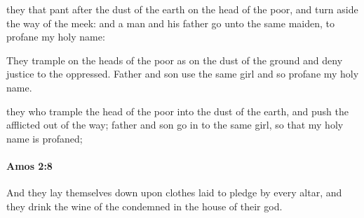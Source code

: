 			\begin{versebox}
					\item[BHS] 
					\item[LXX] 
					\item[ASV] they that pant after the dust of the earth on the head of the poor, and turn aside the way of the meek: and a man and his father go unto the same maiden, to profane my holy name:
					\item[NIV] They trample on the heads of the poor as on the dust of the ground and deny justice to the oppressed. Father and son use the same girl and so profane my holy name.
					\item[NRSV] they who trample the head of the poor into the dust of the earth, and push the afflicted out of the way; father and son go in to the same girl, so that my holy name is profaned;
			\end{versebox}

		\paragraph{Amos 2:8} %
			\label{AMOS-2-8}

			And they lay themselves down upon clothes laid to pledge by every altar, and they drink the wine of the condemned in the house of their god.

